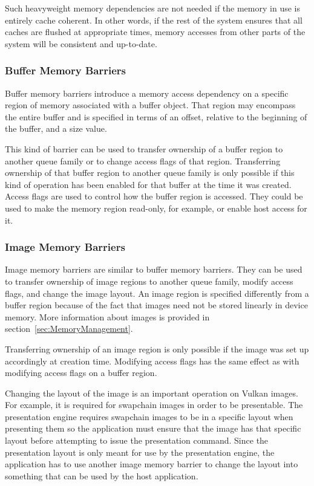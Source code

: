         Such heavyweight memory dependencies are not needed if the memory in use is entirely cache coherent.
        In other words, if the rest of the system ensures that all caches are flushed at appropriate times, memory accesses from other parts of the system will be consistent and up-to-date.

      \subsubsection{Buffer Memory Barriers}
        Buffer memory barriers introduce a memory access dependency on a specific region of memory associated with a buffer object.
        That region may encompass the entire buffer and is specified in terms of an offset, relative to the beginning of the buffer, and a size value.

        This kind of barrier can be used to transfer ownership of a buffer region to another queue family or to change access flags of that region.
        Transferring ownership of that buffer region to another queue family is only possible if this kind of operation has been enabled for that buffer at the time it was created.
        Access flags are used to control how the buffer region is accessed.
        They could be used to make the memory region read-only, for example, or enable \gls{host} access for it.

      \subsubsection{Image Memory Barriers}
        Image memory barriers are similar to buffer memory barriers.
        They can be used to transfer ownership of image regions to another queue family, modify access flags, and change the image layout.
        An image region is specified differently from a buffer region because of the fact that images need not be stored linearly in \gls{device} memory.
        More information about images is provided in section~\ref{sec:MemoryManagement}.

        Transferring ownership of an image region is only possible if the image was set up accordingly at creation time.
        Modifying access flags has the same effect as with modifying access flags on a buffer region.

        Changing the layout of the image is an important operation on Vulkan images.
        For example, it is required for swapchain images in order to be presentable.
        The presentation engine requires swapchain images to be in a specific layout when presenting them so the \gls{application} must ensure that the image has that specific layout before attempting to issue the presentation command.
        Since the presentation layout is only meant for use by the presentation engine, the \gls{application} has to use another image memory barrier to change the layout into something that can be used by the \gls{host} \gls{application}.
